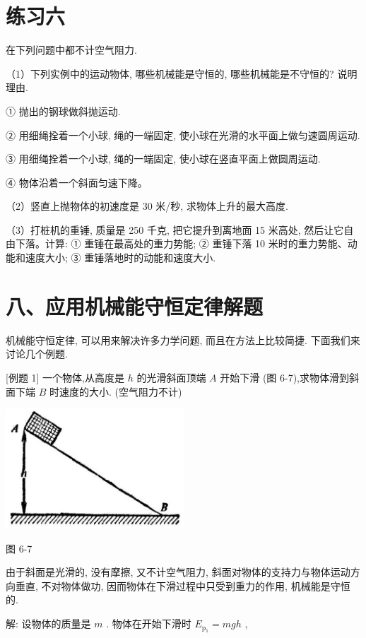 \documentclass[10pt]{article}
\begin{document}
\section*{练习六}

在下列问题中都不计空气阻力.

（1）下列实例中的运动物体, 哪些机械能是守恒的, 哪些机械能是不守恒的? 说明理由.

① 抛出的钢球做斜抛运动.

② 用细绳拴着一个小球, 绳的一端固定, 使小球在光滑的水平面上做匀速圆周运动.

③ 用细绳拴着一个小球, 绳的一端固定, 使小球在竖直平面上做圆周运动.

④ 物体沿着一个斜面匀速下降。

（2）竖直上抛物体的初速度是 30 米/秒, 求物体上升的最大高度.

（3）打桩机的重锤, 质量是 250 千克, 把它提升到离地面 15 米高处, 然后让它自由下落。计算: ① 重锤在最高处的重力势能; ② 重锤下落 10 米时的重力势能、动能和速度大小; ③ 重锤落地时的动能和速度大小.

\section*{八、应用机械能守恒定律解题}

机械能守恒定律, 可以用来解决许多力学问题, 而且在方法上比较简捷. 下面我们来讨论几个例题.

[例题 1] 一个物体,从高度是 \(h\) 的光滑斜面顶端 \(A\) 开始下滑 (图 6-7),求物体滑到斜面下端 \(B\) 时速度的大小. (空气阻力不计)

\begin{center}
\includegraphics[max width=0.5\textwidth]{images/01912d55-147c-70aa-b0e0-1782a122f948_183_441359.jpg}
\end{center}

图 6-7

由于斜面是光滑的, 没有摩擦, 又不计空气阻力, 斜面对物体的支持力与物体运动方向垂直, 不对物体做功, 因而物体在下滑过程中只受到重力的作用, 机械能是守恒的.

解: 设物体的质量是 \(m\) . 物体在开始下滑时 \({E}_{{\mathrm{p}}_{1}} = {mgh}\) ,
\end{document}
